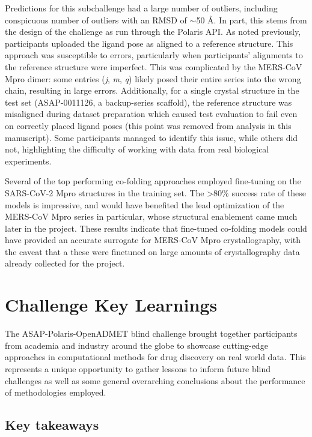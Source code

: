 \documentclass[journal=jcim,manuscript=article]{achemso}
\begin{document}
Predictions for this subchallenge had a large number of outliers, including conspicuous number of outliers with an RMSD of $\sim$50 Å. In part, this stems from the design of the challenge as run through the Polaris API. As noted previously, participants uploaded the ligand pose as aligned to a reference structure. This approach was susceptible to errors, particularly when participants’ alignments to the reference structure were imperfect. This was complicated by the MERS-CoV Mpro dimer: some entries (\textit{j}, \textit{m}, \textit{q}) likely posed their entire series into the wrong chain, resulting in large errors. Additionally, for a single crystal structure in the test set (ASAP-0011126, a backup-series scaffold), the reference structure was misaligned during dataset preparation which caused test evaluation to fail even on correctly placed ligand poses (this point was removed from analysis in this manuscript). Some participants managed to identify this issue, while others did not, highlighting the difficulty of working with data from real biological experiments.

Several of the top performing co-folding approaches employed fine-tuning on the SARS-CoV-2 Mpro structures in the training set. The \textgreater 80\% success rate of these models is impressive, and would have benefited the lead optimization of the MERS-CoV Mpro series in particular, whose structural enablement came much later in the project. These results indicate that fine-tuned co-folding models could have provided an accurate surrogate for MERS-CoV Mpro crystallography, with the caveat that a these were finetuned on large amounts of crystallography data already collected for the project.

\section{Challenge Key Learnings}

The ASAP-Polaris-OpenADMET blind challenge brought together participants from academia and industry around the globe to showcase cutting-edge approaches in computational methods for drug discovery on real world data. This represents a unique opportunity to gather lessons to inform future blind challenges as well as some general overarching conclusions about the performance of methodologies employed.


\subsection{Key takeaways}
\end{document}
